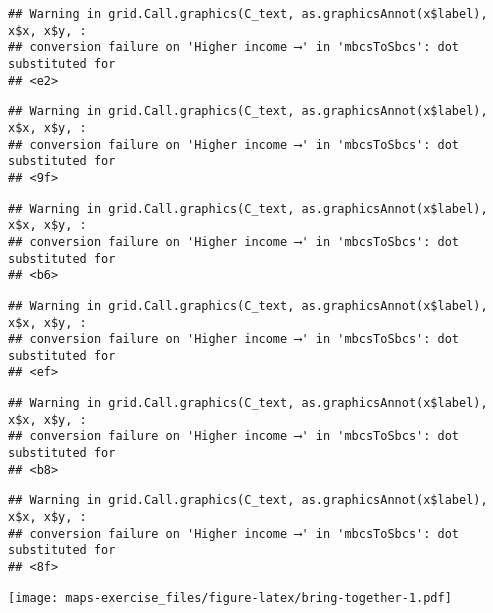 \documentclass[
]{article}
\begin{document}
\begin{verbatim}
## Warning in grid.Call.graphics(C_text, as.graphicsAnnot(x$label), x$x, x$y, :
## conversion failure on 'Higher income ⟶️' in 'mbcsToSbcs': dot substituted for
## <e2>
\end{verbatim}

\begin{verbatim}
## Warning in grid.Call.graphics(C_text, as.graphicsAnnot(x$label), x$x, x$y, :
## conversion failure on 'Higher income ⟶️' in 'mbcsToSbcs': dot substituted for
## <9f>
\end{verbatim}

\begin{verbatim}
## Warning in grid.Call.graphics(C_text, as.graphicsAnnot(x$label), x$x, x$y, :
## conversion failure on 'Higher income ⟶️' in 'mbcsToSbcs': dot substituted for
## <b6>
\end{verbatim}

\begin{verbatim}
## Warning in grid.Call.graphics(C_text, as.graphicsAnnot(x$label), x$x, x$y, :
## conversion failure on 'Higher income ⟶️' in 'mbcsToSbcs': dot substituted for
## <ef>
\end{verbatim}

\begin{verbatim}
## Warning in grid.Call.graphics(C_text, as.graphicsAnnot(x$label), x$x, x$y, :
## conversion failure on 'Higher income ⟶️' in 'mbcsToSbcs': dot substituted for
## <b8>
\end{verbatim}

\begin{verbatim}
## Warning in grid.Call.graphics(C_text, as.graphicsAnnot(x$label), x$x, x$y, :
## conversion failure on 'Higher income ⟶️' in 'mbcsToSbcs': dot substituted for
## <8f>
\end{verbatim}

\texttt{[image: maps-exercise\_files/figure-latex/bring-together-1.pdf]}
\end{document}
